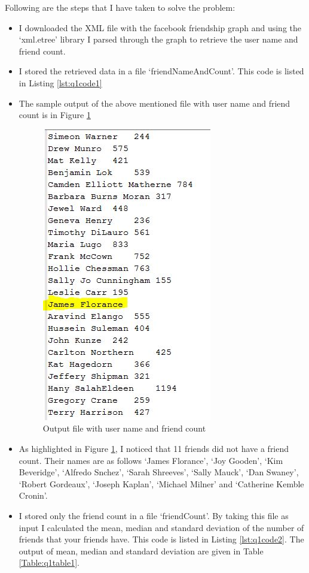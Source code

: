 Following are the steps that I have taken to solve the problem:
\begin{itemize}
\item I downloaded the XML file with the facebook friendship graph and using the `xml.etree' library I parsed through the graph to retrieve the user name and friend count. 
\item I stored the retrieved data in a file `friendNameAndCount'. This code is listed in Listing \ref{lst:q1code1}
\item The sample output of the above mentioned file with user name and friend count is in Figure \ref{fig:q1fig1}
\begin{figure}[h!]
\begin{center}
\includegraphics[scale=0.55, keepaspectratio=true]{figures/data.JPG}
\caption{Output file with user name and friend count}
\label{fig:q1fig1}
\end{center}
\end{figure}
\item As highlighted in Figure \ref{fig:q1fig1}, I noticed that 11 friends did not have a friend count. Their names are as follows `James Florance', `Joy Gooden', `Kim Beveridge', `Alfredo Snchez', `Sarah Shreeves', `Sally Mauck', `Dan Swaney', `Robert Gordeaux', `Joseph Kaplan', `Michael Milner' and `Catherine Kemble Cronin'. 
\item I stored only the friend count in a file `friendCount'. By taking this file as input I calculated the mean, median and standard deviation of the number of friends that your friends have. This code is listed in Listing \ref{lst:q1code2}. The output of mean, median and standard deviation are given in Table \ref{Table:q1table1}.


\end{itemize}
